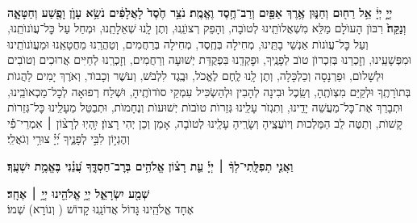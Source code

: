 \documentclass[twoside, openany, parskip=half, 11pt]{book}
\begin{document}
\begin{sometimes}

\\
 \textbf{יְיָ֣ יְיָ֔ אֵ֥ל רַח֖וּם וְחַנּ֑וּן אֶ֥רֶךְ אַפַּ֖יִם וְרַב־חֶ֥סֶד וֶאֱמֶֽת׃ נֹצֵ֥ר חֶ֙סֶד֙ לָאֲלָפִ֔ים נֹשֵׂ֥א עָוֺ֛ן וָפֶ֖שַׁע וְחַטָּאָ֑ה וְנַקֵּה֙׃}
רִבּוֺן הָעוׂלָם מַלֵּא מִשְׁאֲלוׂתֵֽינוּ לְטוׂבָה, וְהָפֵק רְצוׂנֵֽנוּ, וְתֶן לָֽנוּ שְׁאֵלָתֵֽנוּ, וּמְחַל עַל כׇּל־עֲוׂנוׂתֵֽנוּ, וְעַל כׇּל־עֲוׂנוׂת אַנְשֵׁי בָתֵּֽינוּ, מְחִילָה בְּחֶֽסֶד, מְחִילָה בְּרַחֲמִים, וְטַהֲרֵֽנוּ מֵחֲטָאֵֽנוּ וּמֵעֲוׂנוׂתֵֽינוּ וּמִפְּשָׁעֵֽינוּ, וְזׇכְרֵנוּ בְּזִכְרוׂן טוׂב לְפָנֶֽיךָ, וּפׇקְדֵֽנוּ בִּפְקֻדַּת יְשׁוּעָה וְרַחֲמִים, וְזׇכְרֵֽנוּ לְחַיִּים אֲרוּכִים וְטוׂבִים וּלְשָׁלוׂם, וּפַרְנָסָה וְכַלְכָּלָה, וְתֶן לָֽנוּ לֶֽחֶם לֶאֱכׂל, וּבֶֽגֶד לִלְבּׂשׁ, וְעׂשֶׁר וְכָבוׂד, וְאׂרֶךְ יָמִים לַהֲגוׂת בְּתוׂרָתֶֽךָ וּלְקַיֵּם מִצְוׂתֶֽהָ, וְשֵֽׂכֶל וּבִינָה לְהָבִין וּלְהַשְׂכִּיל עִמְקֵי סוׂדוׂתֶֽיהָ, וּשְׁלַח רְפוּאָה לְכׇל־מַכְאוׂבֵֽינוּ, וּתְבָרֵךְ אֶת־כׇּל־מַעֲשֵׁה יָדֵֽינוּ, וְתִגְזׂר עָלֵֽינוּ גְּזֵרוׂת טוׂבוׂת יְשׁוּעוׂת וְנֶחָמוׂת, וּתְבַטֵּל מֵעָלֵֽינוּ כׇּל־גְּזֵרוׂת קָשׁוׂת, וְתַטֶּה לֵב הַמַּלְכוּת וְיוׂעֲצֶֽיהָ וְשָׂרֶֽיהָ עָלֵֽינוּ לְטוׂבָה, אָמֵן וְכֵן יְהִי רָצוׂן׃
%
יִ֥הְיֽוּ לְרָצ֨וֹן ׀ אִמְרֵי־פִ֡י וְהֶגְי֣וֹן לִבִּ֣י לְפָנֶ֑יךָ יְ֝יָ֗ צוּרִ֥י וְגֹאֲלִֽי׃


\textbf{וַאֲנִ֤י תְפִלָּֽתִי־לְךָ֨ ׀ יְיָ֡ עֵ֤ת רָצ֗וֹן אֱלֹהִ֥ים בְּרׇב־חַסְדֶּ֑ךָ עֲ֝נֵ֗נִי בֶּאֱמֶ֥ת יִשְׁעֶֽךָ׃ }

\end{sometimes}

\brikhshmei

\textbf{שְׁמַ֖ע יִשְׂרָאֵ֑ל יְיָ֥ אֱלֹהֵ֖ינוּ יְיָ֥ ׀ אֶחָֽד׃}\\

אֶחָד אֱלֹהֵֽינוּ גָּדוֹל אֲדוֹנֵֽנוּ קָדוֹשׁ ( וְנוֹרָא) שְׁמוֹ׃

\gadlu

\label{al hakol}
\end{document}
